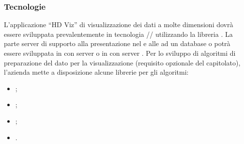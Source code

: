 \documentclass[]{article}
\begin{document}
		\subsubsection{Tecnologie}
		L’applicazione “HD Viz” di visualizzazione dei dati a molte dimensioni dovrà essere sviluppata prevalentemente in tecnologia // utilizzando la libreria .
		La parte server di supporto alla presentazione nel  e alle  ad un database  o  potrà essere sviluppata in  con server  o in  con server .
		Per lo sviluppo di algoritmi di preparazione del dato per la visualizzazione (requisito opzionale del capitolato), l'azienda mette a disposizione alcune librerie per gli algoritmi:
		\begin{itemize}
			\item {};
			\item {};
			\item {};
			\item {}.
		\end{itemize}
\end{document}

